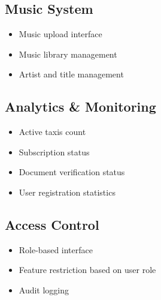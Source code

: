 \documentclass[11pt,a4paper]{article}
\begin{document}
\subsection{Music System}
\begin{itemize}
    \item Music upload interface
    \item Music library management
    \item Artist and title management
\end{itemize}

\subsection{Analytics \& Monitoring}
\begin{itemize}
    \item Active taxis count
    \item Subscription status
    \item Document verification status
    \item User registration statistics
\end{itemize}

\subsection{Access Control}
\begin{itemize}
    \item Role-based interface
    \item Feature restriction based on user role
    \item Audit logging
\end{itemize}
\end{document}
